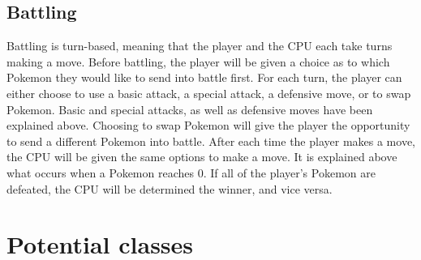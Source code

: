 \documentclass{article}
\begin{document}
  \subsection{Battling}
  Battling is turn-based, meaning that the player and the CPU each take turns making a move. Before battling, the player will be given a choice as to which Pokemon they would like to send into battle first. For each turn, the player can either choose to use a basic attack, a special attack, a defensive move, or to swap Pokemon. Basic and special attacks, as well as defensive moves have been explained above. Choosing to swap Pokemon will give the player the opportunity to send a different Pokemon into battle. After each time the player makes a move, the CPU will be given the same options to make a move. It is explained above what occurs when a Pokemon reaches 0. If all of the player's Pokemon are defeated, the CPU will be determined the winner, and vice versa.
  
  \pagebreak

  \section{Potential classes}
  
  \setlength{\parskip}{0em}
  
\end{document}
